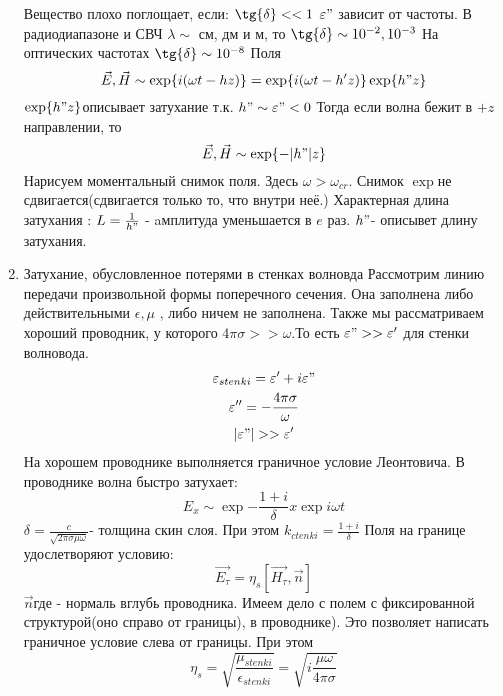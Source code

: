 \begin{enumerate}
	Вещество плохо поглощает, если: $\tg{\delta} << 1$
	$\epsilon"$ зависит от частоты.
	В радиодиапазоне и СВЧ $\lambda \sim$ см, дм и м, то $\tg{\delta} \sim 10^{-2}, 10^{-3}$
	На оптических частотах $\tg{\delta} \sim 10^{-8}$ 
	Поля
	\begin{equation}
		\vec{E}, \vec{H} \sim \exp{i(\omega t - h z)} = \exp{i(\omega t - h' z)} \exp{h" z}
	\end{equation}
	$\exp{h" z}$описывает затухание т.к.  $h" \sim \epsilon" < 0$
	Тогда если волна бежит в $+z$ направлении, то 
	\begin{equation}
		\vec{E}, \vec{H} \sim \exp{-|h"| z}
	\end{equation}
	Нарисуем моментальный снимок поля. Здесь $\omega > \omega_{cr}$.
	Снимок
	$\exp$не сдвигается(сдвигается только то, что внутри неё.)
	Характерная длина затухания : $L = \frac{1}{h"}$ - aмплитуда уменьшается в $e$ раз.
	$h"$- описывет длину затухания.
	\item{Затухание, обусловленное потерями в стенках волновда}
	Рассмотрим линию передачи произвольной формы поперечного сечения. Она заполнена либо действительными $\epsilon, \mu$ , либо ничем не заполнена. Также мы рассматриваем хороший проводник, у которого $4 \pi \sigma >> \omega$.То есть $\epsilon" >> \epsilon'$ для стенки волновода.
	\begin{gather}
		\epsilon_{stenki} = \epsilon' + i \epsilon"\\
		\epsilon'' = - \frac{4 \pi \sigma}{\omega}\\
		|\epsilon"| >> \epsilon'
	\end{gather}
	На хорошем проводнике выполняется граничное условие Леонтовича.
	В проводнике волна быстро затухает:
	\begin{equation}
		E_x \sim \exp{- \frac{1+i}{\delta} x} \exp{ i \omega t}
	\end{equation}
	$\delta = \frac{c}{\sqrt{2 \pi \sigma \mu \omega}}$- толщина скин слоя.
	При этом $k_{ctenki} = \frac{1+i}{\delta}$
	Поля на границе удослетворяют условию:
	\begin{equation}
		\vec{E_{\tau}} = \eta_s [\vec{H_{\tau}}, \vec{n}]
	\end{equation}
	$\vec{n}$где  - нормаль вглубь проводника.
	Имеем дело с полем с фиксированной структурой(оно справо от границы), в проводнике). Это позволяет написать граничное условие слева от границы.
	При этом
	\begin{equation}
		\eta_s = \sqrt{\frac{\mu_{stenki}}{\epsilon_{stenki}}} = \sqrt{i \frac{\mu \omega}{4 \pi \sigma}}

\end{equation}
\end{enumerate}
